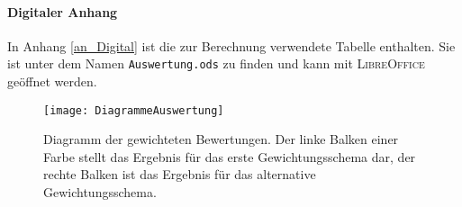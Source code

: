 \paragraph{Digitaler Anhang} In Anhang \ref{an_Digital} ist die zur Berechnung verwendete Tabelle enthalten. Sie ist unter dem Namen \texttt{Auswertung.ods} zu finden und kann mit \textsc{LibreOffice} geöffnet werden.

\begin{figure}\centering
	\texttt{[image: DiagrammeAuswertung]}
	\caption[Diagramm der gewichteten Bewertungen]{Diagramm der gewichteten Bewertungen. Der linke Balken einer Farbe stellt das Ergebnis für das erste Gewichtungsschema dar, der rechte Balken ist das Ergebnis für das alternative Gewichtungsschema.}
	\label{abb_DiagrammAuswertung}
\end{figure}

